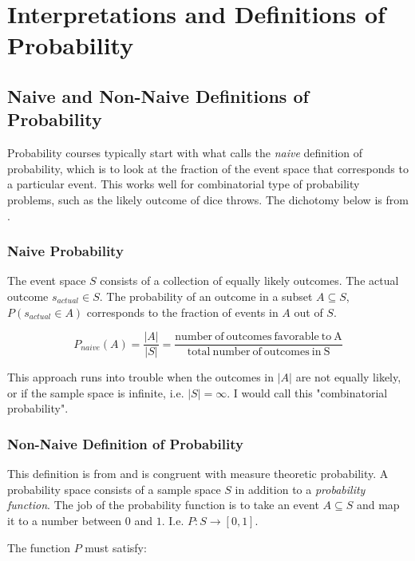 \section{Interpretations and Definitions of Probability}

\subsection{Naive and Non-Naive Definitions of Probability}
Probability courses typically start with what  calls the \textit{naive} definition of probability, which is to look at the fraction of the event space that corresponds to a particular event. This works well for combinatorial type of probability problems, such as the likely outcome of dice throws. The dichotomy below is from .

\subsubsection{Naive Probability}
The event space $S$ consists of a collection of equally likely outcomes. The actual outcome $s_{actual} \in S$. The probability of an outcome in a subset $A\subseteq S$, $P(s_{actual}\in A)$ corresponds to the fraction of events in $A$ out of $S$.

\begin{equation}
P_{naive}(A) = \frac{|A|}{|S|} = \frac{\mathrm{number\ of\ outcomes\ favorable\ to\ A}}{\mathrm{total\ number\ of\ outcomes\ in\ S}}
\end{equation}

This approach runs into trouble when the outcomes in $|A|$ are not equally likely, or if the sample space is infinite, i.e. $|S|=\infty$. I would call this "combinatorial probability".


\subsubsection{Non-Naive Definition of Probability}
This definition is from \cite{blitzstein2019introduction} and is congruent with measure theoretic probability. A probability space consists of a sample space $S$ in addition to a \textit{probability function}. The job of the probability function is to take an event $A\subseteq S$ and map it to a number between $0$ and $1$. I.e.  $P: S \rightarrow [0,1]$.

The function $P$ must satisfy:

